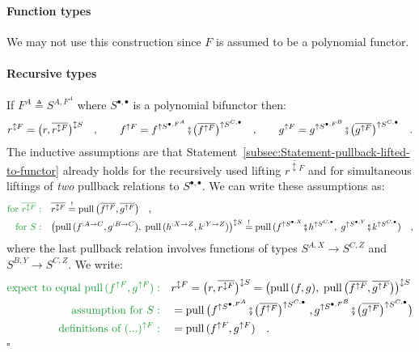 \paragraph{Function types}

We may not use this construction since $F$ is assumed to be a polynomial
functor.

\paragraph{Recursive types}

If $F^{A}\triangleq S^{A,F^{A}}$ where $S^{\bullet,\bullet}$ is
a polynomial bifunctor then:
\[
r^{\updownarrow F}=\big(r,\overline{r^{\updownarrow F}}\big)^{\updownarrow S}\quad,\quad\quad f^{\uparrow F}=f^{\uparrow S^{\bullet,F^{A}}}\bef\big(\overline{f^{\uparrow F}}\big)^{\uparrow S^{C,\bullet}}\quad,\quad\quad g^{\uparrow F}=g^{\uparrow S^{\bullet,F^{B}}}\bef\big(\overline{g^{\uparrow F}}\big)^{\uparrow S^{C,\bullet}}\quad.
\]
The inductive assumptions are that Statement~\ref{subsec:Statement-pullback-lifted-to-functor}
already holds for the recursively used lifting $\overline{r^{\updownarrow F}}$
and for simultaneous liftings of \emph{two} pullback relations to
$S^{\bullet,\bullet}$. We can write these assumptions as:
\begin{align*}
{\color{greenunder}\text{for }\overline{r^{\updownarrow F}}:}\quad & \overline{r^{\updownarrow F}}\overset{!}{=}\text{pull}\,\big(\overline{f^{\uparrow F}},\overline{g^{\uparrow F}}\big)\quad,\\
{\color{greenunder}\text{for }S:}\quad & \big(\text{pull}\,(f^{:A\rightarrow C},g^{:B\rightarrow C}),\;\text{pull}\,(h^{:X\rightarrow Z},k^{:Y\rightarrow Z})\big)^{\updownarrow S}\overset{!}{=}\text{pull}\,(f^{\uparrow S^{\bullet,X}}\bef h^{\uparrow S^{C,\bullet}},\;g^{\uparrow S^{\bullet,Y}}\bef k^{\uparrow S^{C,\bullet}})\quad,
\end{align*}
where the last pullback relation involves functions of types $S^{A,X}\rightarrow S^{C,Z}$
and $S^{B,Y}\rightarrow S^{C,Z}$. We write:
\begin{align*}
{\color{greenunder}\text{expect to equal }\text{pull}\,(f^{\uparrow F},g^{\uparrow F}):}\quad & r^{\updownarrow F}=\big(r,\overline{r^{\updownarrow F}}\big)^{\updownarrow S}=\big(\text{pull}\,(f,g),\;\text{pull}\,\big(\overline{f^{\uparrow F}},\overline{g^{\uparrow F}}\big)\big)^{\updownarrow S}\\
{\color{greenunder}\text{assumption for }S:}\quad & =\text{pull}\,\big(f^{\uparrow S^{\bullet,F^{A}}}\bef\big(\overline{f^{\uparrow F}}\big)^{\uparrow S^{C,\bullet}}\;,g^{\uparrow S^{\bullet,F^{B}}}\bef\big(\overline{g^{\uparrow F}}\big)^{\uparrow S^{C,\bullet}}\big)\\
{\color{greenunder}\text{definitions of }(...)^{\uparrow F}:}\quad & =\text{pull}\,(f^{\uparrow F},g^{\uparrow F})\quad.
\end{align*}
$\square$


